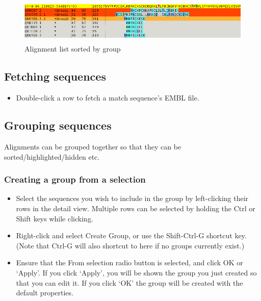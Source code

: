 \documentclass[letterpaper]{article}
\newcommand\liststyleWWviiiNumxvi{%
\renewcommand\labelitemi{{\textbullet}}
\renewcommand\labelitemii{o}
\renewcommand\labelitemiii{[F0A7?]}
\renewcommand\labelitemiv{[F0B7?]}
}
\begin{document}
\begin{figure}
\centering
\color[rgb]{0.30980393,0.5058824,0.7411765}
\includegraphics[width=13.721cm,height=2.164cm]{img_view_sort_by_group.png}
\caption{Alignment list sorted by group}
\end{figure}

\bigskip

{\color[rgb]{0.30980393,0.5058824,0.7411765}\subsection[Fetching sequences]{Fetching sequences}}
\hypertarget{RefHeading2021056909880}{}

\liststyleWWviiiNumxvi
\begin{itemize}
\item {Double-click a row to fetch a match sequence{\textquoteright}s EMBL
file.}
\end{itemize}

{\color[rgb]{0.30980393,0.5058824,0.7411765}\subsection[Grouping sequences]{Grouping sequences}}
\hypertarget{RefHeading2041056909880}{}{
Alignments can be grouped together so that they can be
sorted/highlighted/hidden etc.}

{\color[rgb]{0.30980393,0.5058824,0.7411765}\subsubsection[Creating a group from a selection]{Creating a group from a selection}}
\hypertarget{RefHeading2061056909880}{}\liststyleWWviiiNumxvi
\begin{itemize}
\item {Select the sequences you wish to include in the group by left-clicking their rows in the detail view. Multiple rows can be selected by holding the Ctrl or Shift keys while clicking.}
\item {Right-click and select {\textquotesingle}Create Group{\textquotesingle}, or use the Shift-Ctrl-G shortcut key. (Note that Ctrl-G will also shortcut to here if no groups currently exist.)}
\item {Ensure that the {\textquotesingle}From selection{\textquotesingle} radio button is selected, and click {\textquotesingle}OK{\textquotesingle} or {\textquoteleft}Apply{\textquoteright}. If you click {\textquoteleft}Apply{\textquoteright}, you will be shown the group you just created so that you can edit it. If you click {\textquoteleft}OK{\textquoteright} the group will be created with the
default properties.}
\end{itemize}
\end{document}
